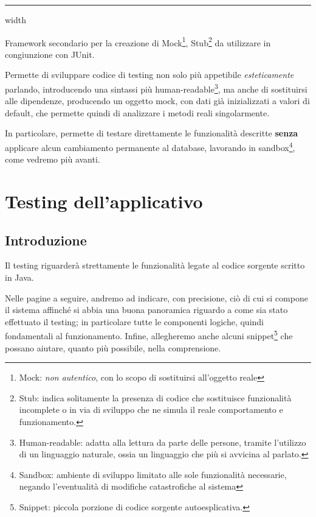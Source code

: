 \begin{description}[leftmargin=!,labelwidth=\widthof{\bfseries JUnit 5 Jupiter}, font=\color{ddchaptercolor!70!black}]
	\begingroup\color{ddchaptercolor}\vspace{6pt}\hrule height 0.4pt depth 0pt width \textwidth\relax\vspace{6pt}\endgroup
	\item[Mockito] Framework secondario per la creazione di Mock\footnote{Mock: \textit{non autentico},
		con lo scopo di sostituirsi all'oggetto reale}, Stub\footnote{Stub: indica solitamente
		la presenza di codice che sostituisce funzionalità incomplete o in via di sviluppo 
		che ne simula il reale comportamento e funzionamento.} 
		da utilizzare in congiunzione con JUnit.
		\par\vspace{3mm}
		Permette di sviluppare codice di testing non solo più appetibile \textit{esteticamente}
		parlando, introducendo una sintassi più human-readable\footnote{Human-readable: adatta alla lettura
		da parte delle persone, tramite l'utilizzo di un linguaggio naturale, ossia un linguaggio
		che più si avvicina al parlato.}, ma anche di sostituirsi alle dipendenze, producendo
		un oggetto mock, con dati già inizializzati a valori di default, che permette
		quindi di analizzare i metodi reali singolarmente.
		\par\vspace{3mm}
		In particolare, permette di testare direttamente le funzionalità descritte
		\textbf{senza} applicare alcun cambiamento permanente al database, lavorando in sandbox\footnote{Sandbox: ambiente
		di sviluppo limitato alle sole funzionalità necessarie, negando l'eventualità di modifiche catastrofiche
		al sistema}, come vedremo più avanti.
\end{description}

\section{Testing dell'applicativo}
\subsection*{Introduzione}
Il testing riguarderà strettamente le funzionalità legate al codice sorgente scritto in Java.

Nelle pagine a seguire, andremo ad indicare, con precisione, ciò di cui si compone il sistema
affinché si abbia una buona panoramica riguardo a come sia stato effettuato il testing; in particolare
tutte le componenti logiche, quindi fondamentali al funzionamento. Infine, allegheremo anche
alcuni snippet\footnote{Snippet: piccola porzione di codice sorgente autoesplicativa.} che
possano aiutare, quanto più possibile, nella comprensione.

